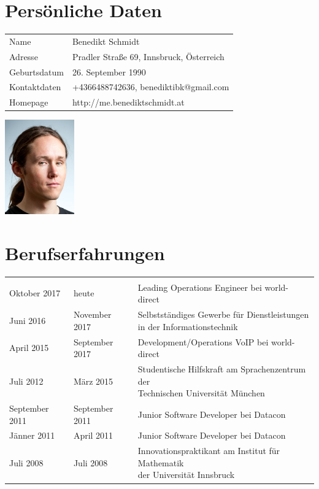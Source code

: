 

	
	\section*{Persönliche Daten}
	\begin{minipage}[t]{13cm}
		\begin{tabularx}{\textwidth}{b{4cm}|l}
			Name & Benedikt Schmidt \\
			Adresse & Pradler Straße 69, Innsbruck, Österreich \\
			Geburtsdatum & 26. September 1990 \\
			Kontaktdaten & +4366488742636, benediktibk@gmail.com \\
			Homepage & http://me.benediktschmidt.at
		\end{tabularx}
	\end{minipage}
	\begin{minipage}[c]{3cm}
		\includegraphics[width=3cm]{portrait.jpg}
	\end{minipage}

	\section*{Berufserfahrungen}
	\begin{tabularx}{\textwidth}{b{4cm}|b{3cm}|l}
		\thead{von} & \thead{bis} & \\
		Oktober 2017 & heute & Leading Operations Engineer bei world-direct \\
		Juni 2016 & November 2017 & \makecell[cl]{Selbstständiges Gewerbe für Dienstleistungen \\ in der Informationstechnik} \\
		April 2015 & September 2017 & Development/Operations VoIP bei world-direct \\
		Juli 2012 & März 2015 & \makecell[cl]{Studentische Hilfskraft am Sprachenzentrum der \\ Technischen Universität München} \\
		September 2011 & September 2011 & Junior Software Developer bei Datacon \\
		Jänner 2011 & April 2011 & Junior Software Developer bei Datacon \\
		Juli 2008 & Juli 2008 & \makecell[cl]{Innovationspraktikant am Institut für Mathematik \\ der Universität Innsbruck}
	\end{tabularx}
	
